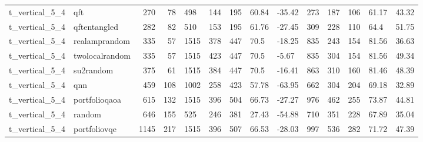 \begin{longtable}{llrrllrllllrll}
t\_vertical\_5\_4 & qft & 270 & 78 & 498 & 144 & 195 & 60.84 & -35.42 & 273 & 187 & 106 & 61.17 & 43.32 \\
t\_vertical\_5\_4 & qftentangled & 282 & 82 & 510 & 153 & 195 & 61.76 & -27.45 & 309 & 228 & 110 & 64.4 & 51.75 \\
t\_vertical\_5\_4 & realamprandom & 335 & 57 & 1515 & 378 & 447 & 70.5 & -18.25 & 835 & 243 & 154 & 81.56 & 36.63 \\
t\_vertical\_5\_4 & twolocalrandom & 335 & 57 & 1515 & 423 & 447 & 70.5 & -5.67 & 835 & 304 & 154 & 81.56 & 49.34 \\
t\_vertical\_5\_4 & su2random & 375 & 61 & 1515 & 384 & 447 & 70.5 & -16.41 & 863 & 310 & 160 & 81.46 & 48.39 \\
t\_vertical\_5\_4 & qnn & 459 & 108 & 1002 & 258 & 423 & 57.78 & -63.95 & 662 & 304 & 204 & 69.18 & 32.89 \\
t\_vertical\_5\_4 & portfolioqaoa & 615 & 132 & 1515 & 396 & 504 & 66.73 & -27.27 & 976 & 462 & 255 & 73.87 & 44.81 \\
t\_vertical\_5\_4 & random & 646 & 155 & 525 & 246 & 381 & 27.43 & -54.88 & 710 & 351 & 228 & 67.89 & 35.04 \\
t\_vertical\_5\_4 & portfoliovqe & 1145 & 217 & 1515 & 396 & 507 & 66.53 & -28.03 & 997 & 536 & 282 & 71.72 & 47.39 \\
\end{longtable}
